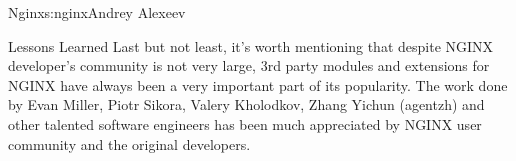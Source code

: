 \begin{aosachapter}{Nginx}{s:nginx}{Andrey Alexeev}
\begin{aosasect1}{Lessons Learned}
Last but not least, it's worth mentioning that despite NGINX
developer's community is not very large, 3rd party modules and
extensions for NGINX have always been a very important part of its
popularity. The work done by Evan Miller, Piotr Sikora, Valery
Kholodkov, Zhang Yichun (agentzh) and other talented software
engineers has been much appreciated by NGINX user community and the
original developers.

\end{aosasect1}

\end{aosachapter}

